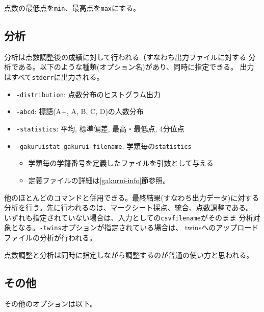 点数の最低点を\texttt{min}、最高点を\texttt{max}にする。

\subsection{分析}
\label{分析}

分析は点数調整後の成績に対して行われる（すなわち出力ファイルに対する
分析である。以下のような種類(オプション名)があり、同時に指定できる。
出力はすべて\texttt{stderr}に出力される。

\begin{itemize}
\item \texttt{-distribution}: 点数分布のヒストグラム出力

\item \texttt{-abcd}: 標語(A+, A, B, C, D)の人数分布

\item \texttt{-statistics}: 平均, 標準偏差, 最高・最低点, 4分位点

\item \texttt{-gakuruistat gakurui-filename}: 学類毎の\texttt{statistics}

\begin{itemize}
\item 学類毎の学籍番号を定義したファイルを引数として与える

\item 定義ファイルの詳細は\ref{gakurui-info}節参照。

\end{itemize}

\end{itemize}

他のほとんどのコマンドと併用できる。最終結果(すなわち出力データ)に対する
分析を行う。先に行われるのは、マークシート採点、統合、点数調整である。
いずれも指定されていない場合は、入力としての\texttt{csvfilename}がそのまま
分析対象となる。\texttt{-twins}オプションが指定されている場合は、
twinsへのアップロードファイルの分析が行われる。

点数調整と分析は同時に指定しながら調整するのが普通の使い方と思われる。

\subsection{その他}
\label{その他}

その他のオプションは以下。

